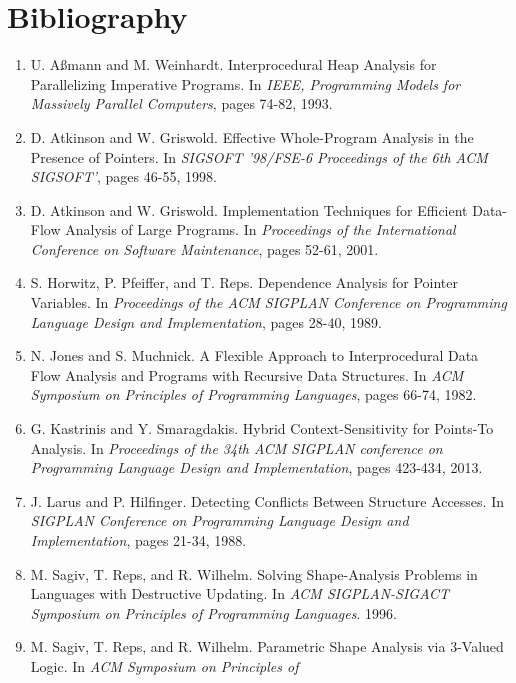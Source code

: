 \documentclass{article}
\begin{document}
\section{Bibliography}

\begin{enumerate}[1.]
    \item U. A{\ss}mann and M. Weinhardt. Interprocedural Heap Analysis for
        Parallelizing Imperative Programs. In \textit{IEEE, Programming
        Models for Massively Parallel Computers}, pages 74-82, 1993.
    \item D. Atkinson and W. Griswold. Effective Whole-Program Analysis in
        the Presence of Pointers. In \textit{SIGSOFT '98/FSE-6 Proceedings
        of the 6th ACM SIGSOFT'}, pages 46-55, 1998.
    \item D. Atkinson and W. Griswold. Implementation Techniques for
        Efficient Data-Flow Analysis of Large Programs. In
        \textit{Proceedings of the International Conference on Software
        Maintenance}, pages 52-61, 2001.
    \item S. Horwitz, P. Pfeiffer, and T. Reps. Dependence Analysis for
        Pointer Variables. In \textit{Proceedings of the ACM SIGPLAN 
        Conference on Programming Language Design and Implementation}, pages
        28-40, 1989.
    \item N. Jones and S. Muchnick. A Flexible Approach to Interprocedural
        Data Flow Analysis and Programs with Recursive Data Structures. In
        \textit{ACM Symposium on Principles of Programming Languages}, pages
        66-74, 1982.
    \item G. Kastrinis and Y. Smaragdakis. Hybrid Context-Sensitivity for
        Points-To Analysis. In \textit{Proceedings of the 34th ACM SIGPLAN
        conference on Programming Language Design and Implementation}, pages
        423-434, 2013.
    \item J. Larus and P. Hilfinger. Detecting Conflicts Between Structure
        Accesses. In \textit{SIGPLAN Conference on Programming Language
        Design and Implementation}, pages 21-34, 1988.
    \item M. Sagiv, T. Reps, and R. Wilhelm. Solving Shape-Analysis Problems
        in Languages with Destructive Updating. In \textit{ACM
        SIGPLAN-SIGACT Symposium on Principles of Programming Languages}.
        1996.
    \item M. Sagiv, T. Reps, and R. Wilhelm. Parametric Shape Analysis via
        3-Valued Logic. In \textit{ACM Symposium on Principles of
}
\end{enumerate}
\end{document}
